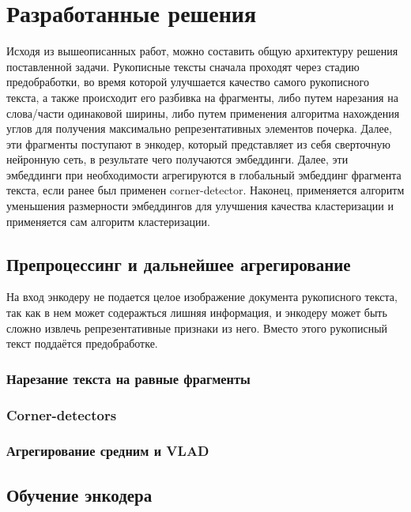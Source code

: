 \section{Разработанные решения}
    Исходя из вышеописанных работ, можно составить общую архитектуру решения поставленной задачи. Рукописные тексты сначала проходят через стадию предобработки, во время которой улучшается качество самого рукописного текста, а также происходит его разбивка на фрагменты, либо путем нарезания на слова/части одинаковой ширины, либо путем применения алгоритма нахождения углов для получения максимально репрезентативных элементов почерка.
    Далее, эти фрагменты поступают в энкодер, который представляет из себя сверточную нейронную сеть, в результате чего получаются эмбеддинги. Далее, эти эмбеддинги при необходимости агрегируются в глобальный эмбеддинг фрагмента текста, если ранее был применен corner-detector. Наконец, применяется алгоритм уменьшения размерности эмбеддингов для улучшения качества кластеризации и применяется сам алгоритм кластеризации.

\subsection{Препроцессинг и дальнейшее агрегирование}

На вход энкодеру не подается целое изображение документа рукописного текста, так как в нем может содеражться лишняя информация, и энкодеру может быть сложно извлечь репрезентативные признаки из него. Вместо этого рукописный текст поддаётся предобработке. 

\subsubsection{Нарезание текста на равные фрагменты}



\subsubsection{Corner-detectors}

\subsubsection{Агрегирование средним и VLAD}

\subsection{Обучение энкодера}

